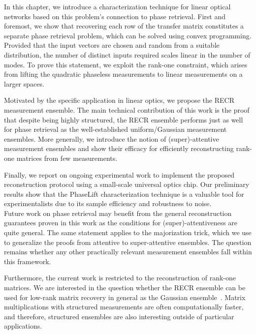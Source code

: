 In this chapter, we introduce a characterization technique for linear optical networks based on this problem's connection to phase retrieval.
First and foremost, we show that recovering each row of the transfer matrix constitutes a separate phase retrieval problem, which can be solved using convex programming.
Provided that the input vectors are chosen and random from a suitable distribution, the number of distinct inputs required scales linear in the number of modes.
To prove this statement, we exploit the rank-one constraint, which arises from lifting the quadratic phaseless measurements to linear measurements on a larger spaces.

Motivated by the specific application in linear optics, we propose the RECR measurement ensemble.
The main technical contribution of this work is the proof that despite being highly structured, the RECR ensemble performs just as well for phase retrieval as the well-established uniform/Gaussian measurement ensembles.
More generally, we introduce the notion of (super)-attentive measurement ensembles and show their efficacy for efficiently reconstructing rank-one matrices from few measurements.

Finally, we report on ongoing experimental work to implement the proposed reconstruction protocol using a small-scale universal optics chip.
Our preliminary results show that the PhaseLift characterization technique is a valuable tool for experimentalists due to its sample efficiency and robustness to noise.\\



Future work on phase retrieval may benefit from the general reconstruction guarantees proven in this work as the conditions for (super)-attentiveness are quite general.
The same statement applies to the majorization trick, which we use to generalize the proofs from attentive to super-attentive ensembles.
The question remains whether any other practically relevant measurement ensembles fall within this framework.

Furthermore, the current work is restricted to the reconstruction of rank-one matrices.
We are interested in the question whether the RECR ensemble can be used for low-rank matrix recovery in general as the Gaussian ensemble~\cite{Kueng_2014_Low}.
Matrix multiplications with structured measurements are often computationally faster, and therefore, structured ensembles are also interesting outside of particular applications.\\



